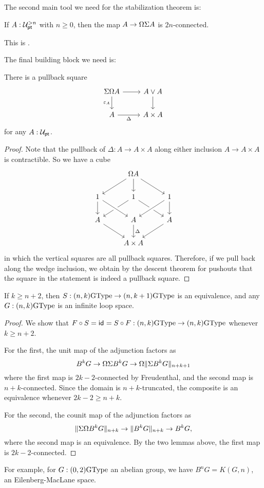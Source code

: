 The second main tool we need for the stabilization theorem is:
\begin{thm}[Freudenthal]
  If $A : \UU_\pt^{>n}$ with $n\ge 0$, then the map
  $A \to \loopspacesym\susp A$ is $2n$-connected.
\end{thm}
This is \cite[Theorem~8.6.4]{hottbook}.

The final building block we need is:
\begin{lem}
  There is a pullback square
  \[
    \begin{tikzcd}
      \susp\loopspacesym A \ar[d,"\varepsilon_A"']\ar[r] & A \vee A \ar[d] \\
      A \ar[r,"\Delta"'] & A \times A
    \end{tikzcd}
  \]
  for any $A : \UU_\pt$.
\end{lem}

\begin{proof}
Note that the pullback of $\Delta:A\to A\times A$ along either inclusion $A\to A\times A$ is contractible. So we have a cube
\begin{equation*}
\begin{tikzcd}
& \loopspacesym A \arrow[dl] \arrow[d] \arrow[dr] \\
1 \arrow[d] & 1 \arrow[dl] \arrow[dr] & 1 \arrow[dl,crossing over] \arrow[d] \\
A \arrow[dr] & A \arrow[d,"\Delta"] \arrow[from=ul,crossing over] & A \arrow[dl] \\
& A\times A
\end{tikzcd}
\end{equation*}
in which the vertical squares are all pullback squares. Therefore, if we pull back along the wedge inclusion, we obtain by the descent theorem for pushouts that the square in the statement is indeed a pullback square.
\end{proof}

\begin{thm}[Stabilization]
  \label{thm:stabilization}
  If $k\ge n+2$, then $S : (n,k)\GType \to (n,k+1)\GType$ is an
  equivalence, and any $G : (n,k)\GType$ is an infinite loop space.
\end{thm}
\begin{proof}
  We show that $F\circ S=\idfunc=S\circ F : (n,k)\GType \to (n,k)\GType$
  whenever $k\ge n+2$.

  For the first, the unit map of the adjunction factors as
  \[
    B^kG \to \loopspacesym\susp B^kG \to \loopspacesym\trunc{n+k+1}{\susp B^kG}
  \]
  where the first map is $2k-2$-connected by Freudenthal, and the
  second map is $n+k$-connected. Since the domain is $n+k$-truncated,
  the composite is an equivalence whenever $2k-2 \ge n+k$.

  For the second, the counit map of the adjunction factors as
  \[
    \trunc{n+k}{\susp\loopspacesym B^kG} \to \trunc{n+k}{B^kG} \to B^kG,
  \]
  where the second map is an equivalence. By the two lemmas above, the
  first map is $2k-2$-connected.
\end{proof}
For example, for $G : (0,2)\GType$ an abelian group, we have
$B^nG = K(G,n)$, an Eilenberg-MacLane space.

